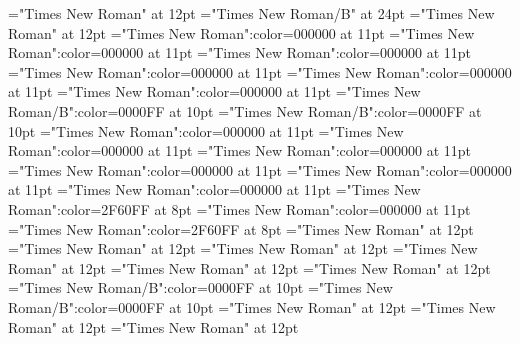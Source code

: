 \documentclass[a4paper]{article}
\begin{document}
 
\pagestyle{plain} 
\sloppy 
\setlength{\parfillskip}{0pt plus 1fil} 
\font{}="Times New Roman" at 12pt
\font{}="Times New Roman/B" at 24pt
\font{}="Times New Roman" at 12pt
\font\entryletDatadicBody="Times New Roman":color=000000 at 11pt
\font\pictureRightentryletDatadicBody="Times New Roman":color=000000 at 11pt
\font\picturepictureRightentryletDatadicBody="Times New Roman":color=000000 at 11pt
\font\pictureCaptionpictureRightentryletDatadicBody="Times New Roman":color=000000 at 11pt
\font\CmPicturepublishStemCaptionSenseNumberpictureCaptionpictureRightentryletDatadicBody="Times New Roman":color=000000 at 11pt
\font\CmPicturepublishStemCaptionCaptionPubptpictureCaptionpictureRightentryletDatadicBody="Times New Roman":color=000000 at 11pt
\font\headwordsehentryletDatadicBody="Times New Roman/B":color=0000FF at 10pt
\font\headwordafterentryletDatadicBody="Times New Roman/B":color=0000FF at 10pt
\font\sensesentryletDatadicBody="Times New Roman":color=000000 at 11pt
\font\sensesensesentryletDatadicBody="Times New Roman":color=000000 at 11pt
\font\grammaticalinfosensesensesentryletDatadicBody="Times New Roman":color=000000 at 11pt
\font\partofspeechptgrammaticalinfosensesensesentryletDatadicBody="Times New Roman":color=000000 at 11pt
\font{}="Times New Roman":color=000000 at 11pt
\font\xitemptdefinitionLcptsensesensesentryletDatadicBody="Times New Roman":color=000000 at 11pt
\font\xlanguagetagenxitemptdefinitionLcptsensesensesentryletDatadicBody="Times New Roman":color=2F60FF at 8pt
\font\xitemendefinitionLcptsensesensesentryletDatadicBody="Times New Roman":color=000000 at 11pt
\font\xlanguagetagenxitemendefinitionLcptsensesensesentryletDatadicBody="Times New Roman":color=2F60FF at 8pt
\font\entrybletDatadicBody="Times New Roman" at 12pt
\font\pictureRightentrybletDatadicBody="Times New Roman" at 12pt
\font\picturepictureRightentrybletDatadicBody="Times New Roman" at 12pt
\font\pictureCaptionpictureRightentrybletDatadicBody="Times New Roman" at 12pt
\font\CmPicturepublishStemCaptionSenseNumberpictureCaptionpictureRightentrybletDatadicBody="Times New Roman" at 12pt
\font\CmPicturepublishStemCaptionCaptionPubptpictureCaptionpictureRightentrybletDatadicBody="Times New Roman" at 12pt
\font\headwordsehentrybletDatadicBody="Times New Roman/B":color=0000FF at 10pt
\font\headwordafterentrybletDatadicBody="Times New Roman/B":color=0000FF at 10pt
\font\sensesentrybletDatadicBody="Times New Roman" at 12pt
\font\sensesensesentrybletDatadicBody="Times New Roman" at 12pt
\font\grammaticalinfosensesensesentrybletDatadicBody="Times New Roman" at 12pt
\end{document}
